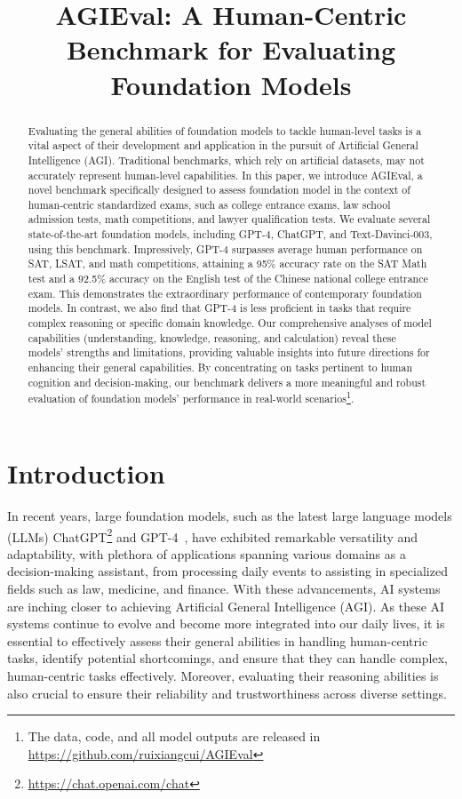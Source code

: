 \title{AGIEval: A Human-Centric Benchmark for Evaluating Foundation Models}

\begin{abstract}
Evaluating the general abilities of foundation models to tackle human-level tasks is a vital aspect of their development and application in the pursuit of Artificial General Intelligence (AGI). Traditional benchmarks, which rely on artificial datasets, may not accurately represent human-level capabilities. In this paper, we introduce {AGIEval}, a novel benchmark specifically designed to assess foundation model in the context of human-centric standardized exams, such as college entrance exams, law school admission tests, math competitions, and lawyer qualification tests. We evaluate several state-of-the-art foundation models, including GPT-4, ChatGPT, and Text-Davinci-003, using this benchmark. Impressively, GPT-4 surpasses average human performance on SAT, LSAT, and math competitions, attaining a 95\% accuracy rate on the SAT Math test and a 92.5\% accuracy on the English test of the Chinese national college entrance exam. This demonstrates the extraordinary performance of contemporary foundation models. In contrast, we also find that GPT-4 is less proficient in tasks that require complex reasoning or specific domain knowledge. Our comprehensive analyses of model capabilities (understanding, knowledge, reasoning, and calculation) reveal these models' strengths and limitations, providing valuable insights into future directions for enhancing their general capabilities. By concentrating on tasks pertinent to human cognition and decision-making, our benchmark delivers a more meaningful and robust evaluation of foundation models' performance in real-world scenarios\footnote{The data, code, and all model outputs are released in \url{https://github.com/ruixiangcui/AGIEval}}.
\end{abstract}

\section{Introduction}
In recent years, large foundation models, such as the latest large language models (LLMs) ChatGPT\footnote{\url{https://chat.openai.com/chat}} and GPT-4~\citep{openai2023gpt4}, have exhibited remarkable versatility and adaptability, with plethora of applications spanning various domains as a decision-making assistant, from processing daily events to assisting in specialized fields such as law, medicine, and finance. With these advancements, AI systems are inching closer to achieving Artificial General Intelligence (AGI). As these AI systems continue to evolve and become more integrated into our daily lives, it is essential to effectively assess their general abilities in handling human-centric tasks, identify potential shortcomings, and ensure that they can handle complex, human-centric tasks effectively. Moreover, evaluating their reasoning abilities is also crucial to ensure their reliability and trustworthiness across diverse settings.

